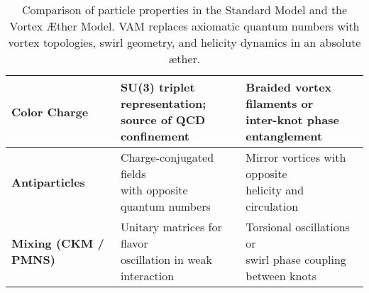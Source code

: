 \begin{table}[H]
\begin{tabular}{|l|l|l|}
        \textbf{Color Charge} &
        \makecell[l]{SU(3) triplet representation; \\ source of QCD confinement} &
        \makecell[l]{Braided vortex filaments or \\ inter-knot phase entanglement} \\
        \hline

        \textbf{Antiparticles} &
        \makecell[l]{Charge-conjugated fields \\ with opposite quantum numbers} &
        \makecell[l]{Mirror vortices with opposite \\ helicity and circulation} \\
        \hline

        \textbf{Mixing (CKM / PMNS)} &
        \makecell[l]{Unitary matrices for flavor \\ oscillation in weak interaction} &
        \makecell[l]{Torsional oscillations or \\ swirl phase coupling between knots} \\
        \hline

    \end{tabular}
    \caption{Comparison of particle properties in the Standard Model and the Vortex Æther Model. VAM replaces axiomatic quantum numbers with vortex topologies, swirl geometry, and helicity dynamics in an absolute æther.}
    \label{tab:SM_vs_VAM_particles}
\end{table}
